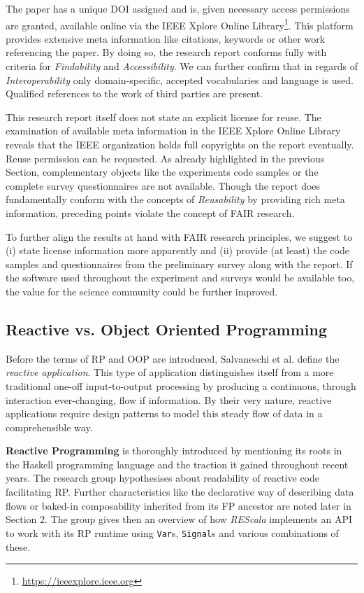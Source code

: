 \documentclass[12pt,a4paper]{article}
\begin{document}
The paper has a unique DOI assigned and is, given necessary access permissions are granted, available online via the IEEE Xplore Online Library\footnote{\url{https://ieeexplore.ieee.org}}. This platform provides extensive meta information like citations, keywords or other work referencing the paper. By doing so, the research report conforms fully with criteria for \emph{Findability} and \emph{Accessibility}. We can further confirm that in regards of \emph{Interoperability} only domain-specific, accepted vocabularies and language is used. Qualified references to the work of third parties are present.

This research report itself does not state an explicit license for reuse. The examination of available meta information in the IEEE Xplore Online Library reveals that the IEEE organization holds full copyrights on the report eventually. Reuse permission can be requested. As already highlighted in the previous Section, complementary objects like the experiments code samples or the complete survey questionnaires are not available. Though the report does fundamentally conform with the concepts of \emph{Reusability} by providing rich meta information, preceding points violate the concept of FAIR research.

To further align the results at hand with FAIR research principles, we suggest to (i) state license information more apparently and (ii) provide (at least) the code samples and questionnaires from the preliminary survey along with the report. If the software used throughout the experiment and surveys would be available too, the value for the science community could be further improved.

\subsection{Reactive vs. Object Oriented Programming}

Before the terms of RP and OOP are introduced, Salvaneschi et al. \cite{7827078} define the \emph{reactive application}. This type of application distinguishes itself from a more traditional one-off input-to-output processing by producing a continuous, through interaction ever-changing, flow if information. By their very nature, reactive applications require design patterns to model this steady flow of data in a comprehensible way.

\textbf{Reactive Programming} is thoroughly introduced by mentioning its roots in the Haskell programming language and the traction it gained throughout recent years. The research group hypothesises about readability of reactive code facilitating RP. Further characteristics like the declarative way of describing data flows or baked-in composability inherited from its FP ancestor are noted later in Section 2. The group gives then an overview of how \emph{REScala} implements an API to work with its RP runtime using \texttt{Var}s, \texttt{Signal}s and various combinations of these.
\end{document}
